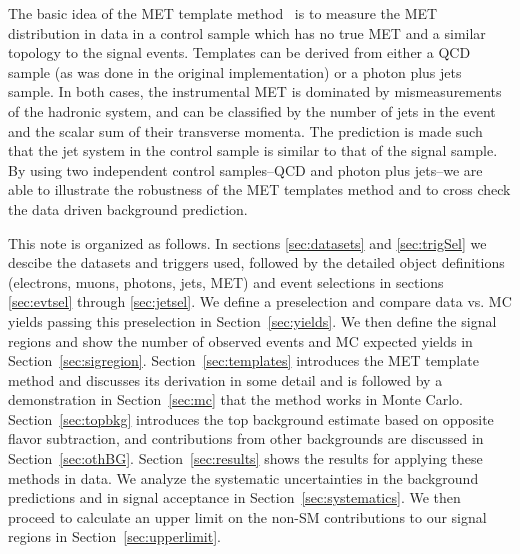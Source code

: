 The basic idea of the MET template method~\cite{ref:templates1}\cite{ref:templates2} is 
to measure the MET distribution in data in a control sample which has no true MET 
and a similar topology to the signal events. 
Templates can be derived from either a QCD sample (as was done in the original implementation) 
or a photon plus jets sample.
In both cases, the instrumental MET is dominated by mismeasurements of the hadronic system,
and can be classified by the number of jets in the event and the scalar sum of their transverse
momenta.
The prediction is made such that the jet system in the control sample is similar to that of the
signal sample.
By using two independent control samples--QCD and photon plus jets--we are able to illustrate
the robustness of the MET templates method and to cross check the data driven background 
prediction.

This note is organized as follows. 
In sections \ref{sec:datasets} and \ref{sec:trigSel} we descibe
the datasets and triggers used, followed by the detailed object definitions (electrons, muons, photons,
jets, MET) and event selections in sections \ref{sec:evtsel} through \ref{sec:jetsel}.
We define a preselection and compare data vs. MC yields passing this preselection in 
Section~\ref{sec:yields}.
We then define the signal regions and show the number of observed events and MC expected 
yields in Section~\ref{sec:sigregion}.
Section~\ref{sec:templates} introduces the MET template method and discusses its derivation 
in some detail and is followed by a demonstration in Section~\ref{sec:mc} 
that the method works in Monte Carlo.
Section~\ref{sec:topbkg} introduces the top background estimate based on opposite flavor subtraction, 
and contributions from other backgrounds are discussed in Section~\ref{sec:othBG}.
Section~\ref{sec:results} shows the results for applying these methods in data.
We analyze the systematic uncertainties in the background predictions and in signal acceptance
in Section~\ref{sec:systematics}. 
We then proceed to calculate an upper limit on the non-SM contributions to our signal regions 
in Section~\ref{sec:upperlimit}. 

